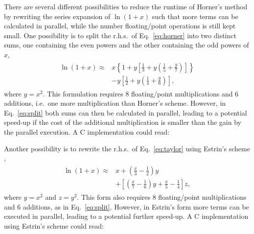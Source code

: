 \documentclass[10pt,DIV16,twocolumn,numbers=noenddot]{scrartcl}
\begin{document}
There are several different possibilities to reduce the runtime of
Horner's method by rewriting the series expansion of $\ln(1+x)$ such
that more terms can be calculated in parallel, while the number
floating\-/point operations is still kept small.  One possibility is
to split the r.h.s.\ of Eq.~\eqref{eq:horner} into two distinct sums,
one containing the even powers and the other containing the odd powers
of $x$,
%
\begin{align}
\begin{split}
  \ln(1+x) \approx{}& x \left\{1 + y \left[\frac{1}{3} + y
  \left(\frac{1}{5} + \frac{y}{7}\right)\right]\right\} \\
  &- y\left[\frac{1}{2} + y\left(\frac{1}{4} + \frac{y}{6}\right)\right],
\end{split}\label{eq:split}%
\end{align}
%
where $y=x^2$.  This formulation requires 8 floating\-/point
multiplications and 6 additions, i.e.\ one more multiplication than
Horner's scheme.  However, in Eq.~\eqref{eq:split} both sums can then
be calculated in parallel, leading to a potential speed-up if the cost
of the additional multiplication is smaller than the gain by the
parallel execution.  A C implementation could read:
%

%
Another possibility is to rewrite the r.h.s.\ of Eq.~\eqref{eq:taylor}
using Estrin's scheme \cite{estrin},
%
\begin{align}
\begin{split}
  \ln(1+x) \approx{}& x + \left(\frac{x}{3}-\frac{1}{2}\right)
    y \\ &+\left[\left(\frac{x}{7}-\frac{1}{6}\right)
    y+\frac{x}{5}-\frac{1}{4}\right] z,
\end{split}\label{eq:estrin}%
\end{align}
%
where $y=x^2$ and $z=y^2$.  This form also requires 8 floating\-/point
multiplications and 6 additions, as in Eq.~\eqref{eq:split}.  However,
in Estrin's form more terms can be executed in parallel, leading to a
potential further speed-up.  A C implementation using Estrin's scheme
could read:
%

\end{document}
